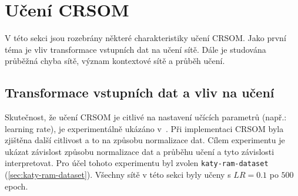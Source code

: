 \documentclass[thesis=M,czech]{FITthesis}[2012/06/26]
\begin{document}
  
\section{Učení CRSOM}
V této sekci jsou rozebrány některé charakteristiky učení CRSOM. Jako první téma je vliv transformace vstupních dat na učení sítě. Dále je studována průběžná chyba sítě, význam kontextové sítě a průběh učení.


\subsection{Transformace vstupních dat a vliv na učení}

Skutečnost, že učení CRSOM je citlivé na nastavení učících parametrů (např.: learning rate), je experimentálně ukázáno v~\cite{hartonomain}. Při implementaci CRSOM byla zjištěna další citlivost a to na způsobu normalizace dat.
Cílem experimentu je ukázat závislost způsobu normalizace dat a průběhu učení a tyto závislosti interpretovat. 
Pro účel tohoto experimentu byl zvolen \texttt{katy-ram-dataset} (\ref{sec:katy-ram-dataset}). Všechny sítě v této sekci byly učeny s $LR=0.1$ po $500$ epoch.
\end{document}
